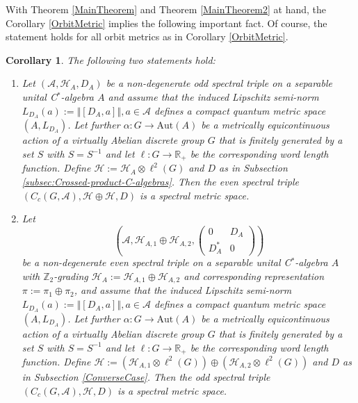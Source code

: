 \documentclass[a4paper,11pt,reqno]{amsart}
\numberwithin{equation}{section}
\numberwithin{equation}{section}
\newtheorem{corollary}[theorem]{Corollary}
\theoremstyle{definition}
\theoremstyle{remark}
\theoremstyle{remark}
\begin{document}
With Theorem \ref{MainTheorem} and Theorem \ref{MainTheorem2} at hand, the Corollary \ref{OrbitMetric} implies
the following important fact. Of course, the statement holds for all
orbit metrics as in Corollary \ref{OrbitMetric}.

\begin{corollary} \label{VirtuallyAbelian} The following two statements hold:
\begin{enumerate}
\item Let $(\mathcal{A},\mathcal{H}_{A},D_{A})$
be a non-degenerate odd spectral triple on a separable unital C$^{\ast}$-algebra
$A$ and assume that the induced Lipschitz semi-norm $L_{D_{A}}(a):=\left\Vert [D_{A},a]\right\Vert ,a\in\mathcal{A}$
defines a compact quantum metric space $(A,L_{D_{A}})$. Let further
$\alpha:G\rightarrow\text{Aut}(A)$ be a metrically equicontinuous
action of a virtually Abelian discrete group $G$ that is finitely
generated by a set $S$ with $S=S^{-1}$ and let $\ell:G\rightarrow\mathbb{R}_{+}$
be the corresponding word length function. Define $\mathcal{H}:=\mathcal{H}_{A}\otimes\ell^{2}(G)$
and $D$ as in Subsection \ref{subsec:Crossed-product-C-algebras}.
Then the even spectral triple $(C_{c}(G,\mathcal{A}),\mathcal{H}\oplus\mathcal{H},D)$
is a spectral metric space.
\item Let
\[
\left(\mathcal{A},\mathcal{H}_{A,1}\oplus\mathcal{H}_{A,2},\left(\begin{array}{cc}
0 & D_{A}\\
D_{A}^{\ast} & 0
\end{array}\right)\right)
\]
be a non-degenerate even spectral triple on a separable unital C$^{\ast}$-algebra
$A$ with $\mathbb{Z}_{2}$-grading $\mathcal{H}_{A}:=\mathcal{H}_{A,1}\oplus\mathcal{H}_{A,2}$
and corresponding representation $\pi:=\pi_{1}\oplus\pi_{2}$, and assume that the induced Lipschitz semi-norm $L_{D_{A}}(a):=\left\Vert [D_{A},a]\right\Vert ,a\in\mathcal{A}$
defines a compact quantum metric space $(A,L_{D_{A}})$. Let further
$\alpha:G\rightarrow\text{Aut}(A)$ be a metrically equicontinuous
action of a virtually Abelian discrete group $G$ that is finitely
generated by a set $S$ with $S=S^{-1}$ and let $\ell:G\rightarrow\mathbb{R}_{+}$
be the corresponding word length function. Define $\mathcal{H}:=(\mathcal{H}_{A,1}\otimes\ell^{2}(G))\oplus(\mathcal{H}_{A,2}\otimes\ell^{2}(G))$
and $D$ as in Subsection \ref{ConverseCase}.
Then the odd spectral triple $(C_{c}(G,\mathcal{A}),\mathcal{H},D)$
is a spectral metric space.
\end{enumerate}
 \end{corollary}
\end{document}
